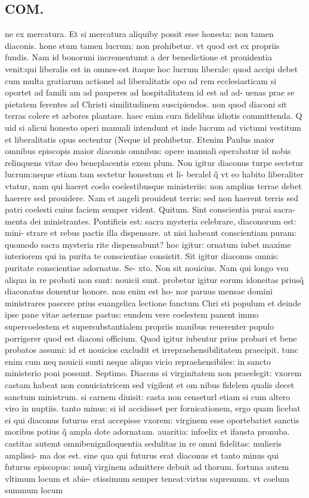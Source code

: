 \documentclass{article}
\begin{document}
\begin{pages}
\section*{COM. }
\marginpar{[ p.3 ]}\pstart ne ex mercatura. Et si mercatura aliquiby possit esse honesta: non tamen diaconis. hone stum tamen lucrum: non prohibetur. vt quod est ex propriis fundis. Nam id bonoruni incrementumt a der benedictione et prouidentia venit:qui liberalis est in omnes-est itaque  hoc lucrum liberale: quod accipi debet cum multa gratiarum actionel ad liberalitatis opo ad rem ecclesiasticam si oportet ad famili am ad pauperes ad hospitalitatem id est ad ad- uenas prae se pietatem ferentes ad Christi similitudinem suscipiendos. non quod diaconi sit terras colere et arbores plantare. haec enim cura fidelibus idiotis committenda. Q uid si alicui honesto operi manuali intendunt et inde lucrum ad victumi vestitum et liberalitatis opus sectentur (Neque id prohibetur. Etenim Paulus maior omnibus episcopis maior diaconis omnibus: opere manuali operabatur id nobis relinquens vitae deo beneplacentis exem plum. Non igitur diaconus turpe sectetur lucrum:neque etiam tam sectetur honestum et li- beralel q̃ vt eo habito liberaliter vtatur, nam qui haeret coelo coelestibusque ministeriis: non amplius terrae debet haerere sed prouidere. Nam et angeli prouident terris: sed non haerent terris sed patri coelesti cuius faciem semper vident. Quitum. Sint conscientia purai sacra- menta dei ministrantes. Pontificis est: sacra mysteria celebrare, diaconorum est: mini- strare et rebus pactis illa dispensare. at nisi habeant conscientiam puram: quomodo sacra mysteria rite dispensabunt? hoc igitur: ornatum iubet maxime interiorem qui in purita te conscientiae consistit. Sit igitur diaconus omnis: puritate conscientiae adornatus. Se- xto. Non sit nouicius. Nam qui longo vsu aliqua in re probati non sunt: nouicii sunt. probetur igitur eorum idoneitas priusq̃ diaconatus donentur honore. non enim est ho- nor paruus mensae domini ministrares pascere prius euangelica lectione fanctum Chri sti populum et deinde ipse pane vitae aeternae pastus: eundem vere coelestem panent immo supercoelestem et supersubstantialem propriis manibus reuerenter populo porrigerer quod est diaconi officium. Quod igitur iubentur prius probari et bene probatos assumi: id et nouicios excludit et irrepraehensibilitatem praecipit. tunc enim cum neq nouicii sunti neque aliquo vicio repraehensibiles: in sancto ministerio poni possunt. Septimo. Diacons si virginitatem non praeelegit: vxorem castam habeat non conuiciatricem sed vigilent et om nibus fidelem qualis decet sanctum ministrum. si carnem diuisit: casta non censeturl etiam si cum altero viro in nuptiis. tanto minus: si id accidisset per fornicationem, ergo quam licebat ei qui diaconus futurus erat accepisse vxorem: virginem esse oportebatiet sanctis moribus potius q̃ ampla dote adornatam. auaritia: infoelix et ifausta pronuba. castitas autemt omnibenigniloquentia sedulitas in re omni fidelitas: mulieris amplissi- ma dos est. sine qua qui futurus erat diaconus et tanto minus qui futurus episcopus: nunq̃ virginem admittere debuit ad thorum. fortuna autem vltimum locum et abie- ctissimum semper teneat:virtus supremum. vt coelum summum locum 
\end{pages}
\end{document}

